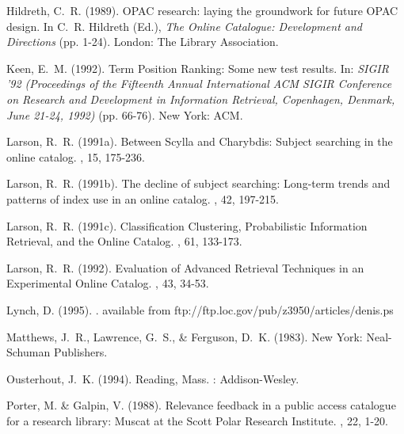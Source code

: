 \begin{thebibliography}{99}
Hildreth, C.~R. (1989). 
\newblock OPAC research: laying the groundwork for
future OPAC design.
\newblock In C.~R. Hildreth (Ed.), {\em The Online
Catalogue: Development and Directions} (pp. 1-24). London: The
Library Association.

Keen, E.~M. (1992).
\newblock Term Position Ranking: Some new test results.
\newblock In: {\em SIGIR '92 (Proceedings of the Fifteenth Annual International
ACM SIGIR Conference on Research and Development in Information Retrieval,
Copenhagen, Denmark, June 21-24, 1992)} (pp. 66-76). New York: ACM.

Larson, R.~R. (1991a).
\newblock Between Scylla and Charybdis: Subject searching in the online
catalog.
, 15, 175-236.

Larson, R.~R. (1991b).
\newblock The decline of subject searching: Long-term trends and patterns
of index use in an online catalog.
, 
42, 197-215.

Larson, R.~R. (1991c).
\newblock Classification Clustering, Probabilistic Information Retrieval,
and the Online Catalog.
, 61, 133-173.

Larson, R.~R. (1992).
\newblock Evaluation of Advanced Retrieval Techniques in an Experimental 
Online Catalog.
, 43,
34-53.

Lynch, D. (1995).
. available from 
ftp://ftp.loc.gov/pub/z3950/articles/denis.ps

Matthews, J.~R., Lawrence, G.~S., \& Ferguson, D.~K. (1983).
\newblock New York: Neal-Schuman Publishers.

Ousterhout, J.~K. (1994).
\newblock Reading, Mass. : Addison-Wesley.

Porter, M. \& Galpin, V. (1988).
\newblock Relevance feedback in a public access catalogue
for a research library: Muscat at the Scott Polar Research Institute.
, 22, 1-20.


\end{thebibliography}
